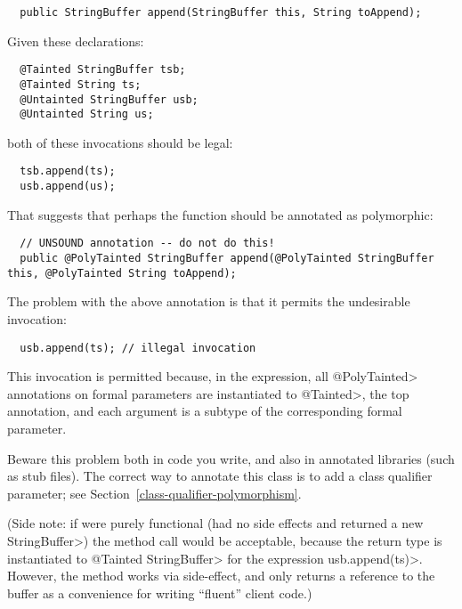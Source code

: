 \begin{Verbatim}
  public StringBuffer append(StringBuffer this, String toAppend);
\end{Verbatim}

Given these declarations:

\begin{Verbatim}
  @Tainted StringBuffer tsb;
  @Tainted String ts;
  @Untainted StringBuffer usb;
  @Untainted String us;
\end{Verbatim}

\noindent
both of these invocations should be legal:

\begin{Verbatim}
  tsb.append(ts);
  usb.append(us);
\end{Verbatim}

That suggests that perhaps the function should be annotated as polymorphic:

\begin{Verbatim}
  // UNSOUND annotation -- do not do this!
  public @PolyTainted StringBuffer append(@PolyTainted StringBuffer this, @PolyTainted String toAppend);
\end{Verbatim}

The problem with the above annotation is that it permits the undesirable
invocation:

\begin{Verbatim}
  usb.append(ts); // illegal invocation
\end{Verbatim}

\noindent
This invocation is permitted because, in the expression, all
\<@PolyTainted> annotations on formal parameters are instantiated to
\<@Tainted>, the top annotation, and each argument is a subtype of the
corresponding formal parameter.

Beware this problem both in code you write, and also in annotated libraries
(such as stub files).  The correct way to annotate this class is to
add a class qualifier parameter; see Section~\ref{class-qualifier-polymorphism}.

(Side note:  if  were purely functional (had no side effects
and returned a new \<StringBuffer>) the method call would be acceptable,
because the return type is instantiated to \<@Tainted StringBuffer> for the
expression \<usb.append(ts)>.  However, the  method works via
side-effect, and only returns a reference to the buffer as a convenience
for writing ``fluent'' client code.)


